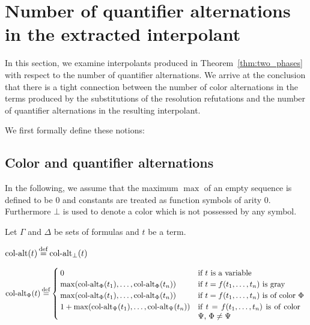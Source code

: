 
\section{Number of quantifier alternations in the extracted interpolant}

In this section, we examine interpolants produced in Theorem~\ref{thm:two_phases} with respect to the number of quantifier alternations.
We arrive at the conclusion that there is a tight connection between the number of color alternations in the terms produced by the substitutions of the resolution refutations and the number of quantifier alternations in the resulting interpolant.  

We first formally define these notions:

\subsection{Color and quantifier alternations}

In the following, we assume that the maximum $\max$ of an empty sequence is defined to be $0$ and constants are treated as function symbols of arity $0$.
Furthermore $\bot$ is used to denote a color which is not possessed by any symbol.
\begin{defi}
	Let $\Gamma$ and $\Delta$ be sets of formulas and $t$ be a term.

	\medskip

	\noindent
	$\ca(t) \defeq \ca_\bot(t)$
	\medskip

	\begin{adjustwidth}{-1.7em}{}
	\noindent
	$
	\ca_\Phi(t) \defeq 
	\begin{cases}
		0 & \text{if $t$ is a variable} \\
		\max(\ca_\Phi(t_1), \dots, \ca_\Phi(t_n)) & \text{if $t = f(t_1, \dots, t_n)$ is gray} \\
		\max(\ca_\Phi(t_1), \dots, \ca_\Phi(t_n)) & \parbox[t]{0.4\textwidth}{if $t = f(t_1, \dots, t_n)$ is of color $\Phi$} \\
		1 + \max(\ca_\Psi(t_1), \dots, \ca_\Psi(t_n)) & \parbox[t]{0.38\textwidth}{if $t = f(t_1, \dots, t_n)$ is of color $\Psi$, $\Phi \neq \Psi$} \\
	\end{cases}
	$
\end{adjustwidth}
\end{defi}


